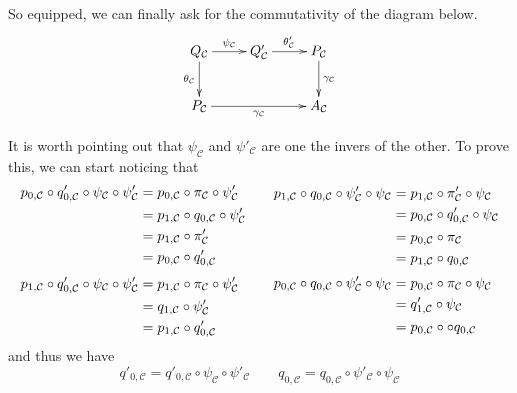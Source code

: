 \documentclass[a4paper,UKenglish,cleveref,pdftex,thm-restate,numberwithinsect]{lipics-v2021}
\begin{document}
\begin{definition}
\begin{enumerate}
	So equipped, we can finally ask for the commutativity of the diagram below.
	\[\xymatrix{Q_{\mathcal{C}}\ar[d]_{\theta_{\mathcal{C}}} \ar[r]^{\psi_{\mathcal{C}}}& Q_{\mathcal{C}}' \ar[r]^{\theta_{\mathcal{C}}'} & P_{\mathcal{C}} \ar[d]^{\gamma_{\mathcal{C}}}\\ P_{\mathcal{C}} \ar[rr]_{\gamma_{\mathcal{C}}}&& A_{\mathcal{C}}}\]
\end{enumerate}
\end{definition}

\begin{remark}\label{rem:iso}
It is worth pointing out that $\psi_{\mathcal{C}}$ and $\psi'_{\mathcal{C}}$ are one the invers of the other. To prove this, we can start noticing that
\[\begin{split} 
	p_{0, \mathcal{C}}\circ q'_{0, \mathcal{C}}\circ \psi_{\mathcal{C}}\circ \psi'_{\mathcal{C}}&=p_{0, \mathcal{C}}\circ \pi_{\mathcal{C}}\circ \psi'_{\mathcal{C}}\\&= p_{1, \mathcal{C}} \circ q_{0, \mathcal{C}} \circ \psi'_{\mathcal{C}}\\&=p_{1, \mathcal{C}}\circ \pi'_{\mathcal{C}}\\&= p_{0, \mathcal{C}}\circ q'_{0, \mathcal{C}} 
	\\[.2\baselineskip]
	p_{1, \mathcal{C}}\circ q'_{0, \mathcal{C}}\circ \psi_{\mathcal{C}}\circ \psi'_{\mathcal{C}}&=p_{1, \mathcal{C}}\circ \pi_{\mathcal{C}}\circ \psi'_{\mathcal{C}}\\&= q_{1, \mathcal{C}} \circ \psi'_{\mathcal{C}}\\&=p_{1, \mathcal{C}}\circ q'_{0, \mathcal{C}}
\end{split}\qquad \begin{split}
p_{1, \mathcal{C}}\circ q_{0, \mathcal{C}}\circ \psi'_{\mathcal{C}}\circ \psi_{\mathcal{C}}&=p_{1, \mathcal{C}}\circ \pi'_{\mathcal{C}}\circ \psi_{\mathcal{C}}\\&= p_{0, \mathcal{C}} \circ q'_{0, \mathcal{C}} \circ \psi_{\mathcal{C}}\\&=p_{0, \mathcal{C}}\circ \pi_{\mathcal{C}}\\&= p_{1, \mathcal{C}}\circ q_{0, \mathcal{C}}\\[.2\baselineskip] 	p_{0, \mathcal{C}}\circ q_{0, \mathcal{C}}\circ \psi'_{\mathcal{C}}\circ \psi_{\mathcal{C}}&=p_{0, \mathcal{C}}\circ \pi_{\mathcal{C}}\circ \psi_{\mathcal{C}}\\&= q'_{1, \mathcal{C}} \circ \psi_{\mathcal{C}}\\&=p_{0, \mathcal{C}}\circ \circ q_{0, \mathcal{C}}
\end{split}\]
and thus we have
\[q'_{0, \mathcal{C}}=q'_{0, \mathcal{C}}\circ \psi_{\mathcal{C}}\circ \psi'_{\mathcal{C}} \qquad q_{0, \mathcal{C}} = q_{0, \mathcal{C}}\circ \psi'_{\mathcal{C}}\circ \psi_{\mathcal{C}}\]


\end{remark}
\end{document}
